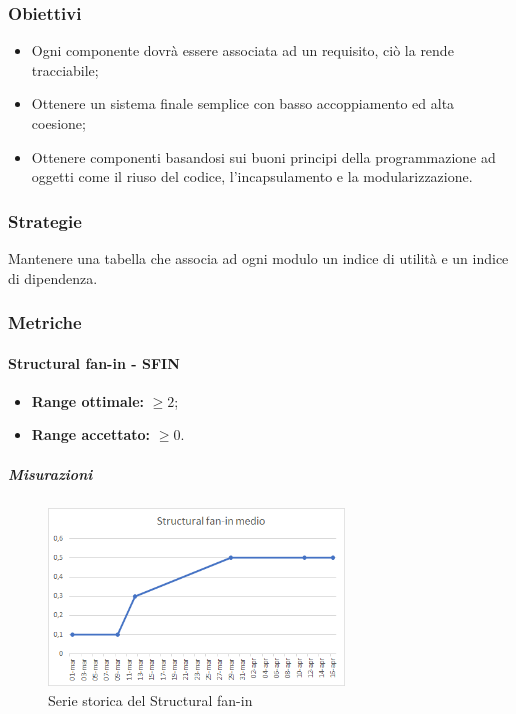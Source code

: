 		\subsubsection{Obiettivi}
		\begin{itemize}
			\item Ogni componente dovrà essere associata ad un requisito, ciò la rende tracciabile;
			\item Ottenere un sistema finale semplice con basso accoppiamento ed alta coesione;
			\item Ottenere componenti basandosi sui buoni principi della programmazione ad oggetti come il riuso del codice, l'incapsulamento e la modularizzazione.
		\end{itemize}
		\subsubsection{Strategie}
		Mantenere una tabella che associa ad ogni modulo un indice di utilità e un indice di dipendenza.
		\subsubsection{Metriche}
			\paragraph{Structural fan-in - SFIN} \Spazio
			\begin{itemize}
				\item \textbf{Range ottimale:} $\geq 2$;
				\item \textbf{Range accettato:} $\geq 0$.
			\end{itemize}
		    \subparagraph{Misurazioni}
		    \begin{figure}[H]
		    	\centering 
		    	\includegraphics[width=0.7\textwidth]{Images/SFIN.png}
		    	\caption{Serie storica del Structural fan-in}
		    	\label{SFIN} 
		    \end{figure}
